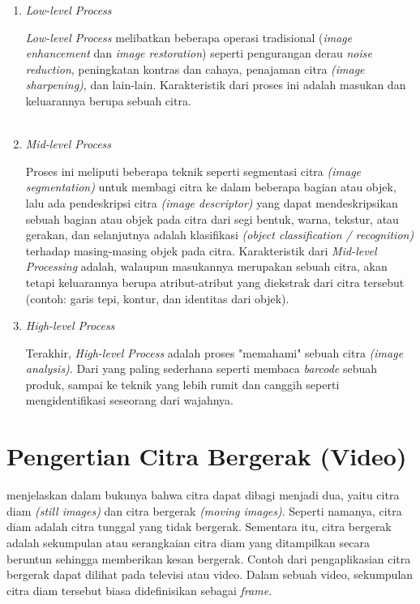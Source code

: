     \begin{enumerate}
        \item \textit{Low-level Process}
        
        \textit{Low-level Process} melibatkan beberapa operasi tradisional (\textit{image enhancement} dan \textit{image restoration}) seperti pengurangan derau \textit{noise reduction}, peningkatan kontras dan cahaya, penajaman citra \textit{(image sharpening)}, dan lain-lain. Karakteristik dari proses ini adalah masukan dan keluarannya berupa sebuah citra.\\\\
        
        \item \textit{Mid-level Process}
        
        Proses ini meliputi beberapa teknik seperti segmentasi citra \textit{(image segmentation)} untuk membagi citra ke dalam beberapa bagian atau objek, lalu ada pendeskripsi citra \textit{(image descriptor)} yang dapat mendeskripsikan sebuah bagian atau objek pada citra dari segi bentuk, warna, tekstur, atau gerakan, dan selanjutnya adalah klasifikasi \textit{(object classification / recognition)} terhadap masing-masing objek pada citra. Karakteristik dari \textit{Mid-level Processing} adalah, walaupun masukannya merupakan sebuah citra, akan tetapi keluarannya berupa atribut-atribut yang diekstrak dari citra tersebut (contoh: garis tepi, kontur, dan identitas dari objek). 
        
        \item \textit{High-level Process}
        
        Terakhir, \textit{High-level Process} adalah proses "memahami" sebuah citra \textit{(image analysis)}. Dari yang paling sederhana seperti membaca \textit{barcode} sebuah produk, sampai ke teknik yang lebih rumit dan canggih seperti mengidentifikasi seseorang dari wajahnya.
    \end{enumerate}

\section{Pengertian Citra Bergerak (Video)}
    \citet{Munir2004} menjelaskan dalam bukunya bahwa citra dapat dibagi menjadi dua, yaitu citra diam \textit{(still images)} dan citra bergerak \textit{(moving images)}. Seperti namanya, citra diam adalah citra tunggal yang tidak bergerak. Sementara itu, citra bergerak adalah sekumpulan atau serangkaian citra diam yang ditampilkan secara beruntun sehingga memberikan kesan bergerak. Contoh dari pengaplikasian citra bergerak dapat dilihat pada televisi atau video. Dalam sebuah video, sekumpulan citra diam tersebut biasa didefinisikan sebagai \textit{frame}.
    
